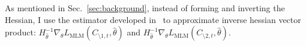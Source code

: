 As mentioned in Sec.~\ref{sec:background}, instead of forming and inverting the Hessian, I use the estimator developed in~\cite{second-order-approx} to approximate inverse hessian vector product: $H^{-1}_{\hat{\theta}} \nabla_\theta L_\text{MLM}(C_{\setminus 1, t}, \hat{\theta})$ and $H^{-1}_{\hat{\theta}} \nabla_\theta L_\text{MLM}(C_{\setminus 2, t}, \hat{\theta})$.

